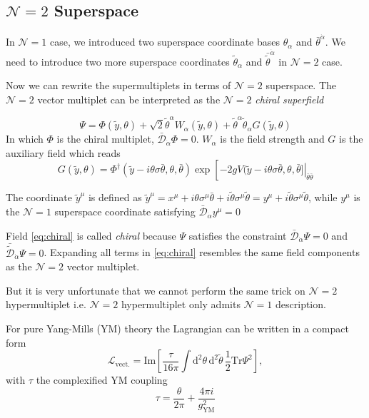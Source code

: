 \documentclass{article}
\begin{document}
\subsection{$\mathcal{N}=2$ Superspace}
In $\mathcal{N}=1$ case, we introduced two superspace coordinate bases $\theta_\alpha$ and $\bar{\theta}^{\dot{\alpha}}$. We need to introduce two more superspace coordinates $\tilde{\theta}_\alpha$ and $\bar{\tilde{\theta}}^{\dot{\alpha}}$ in $\mathcal{N}=2$ case.

Now we can rewrite the supermultiplets in terms of $\mathcal{N}=2$ superspace. The $\mathcal{N}=2$ vector multiplet can be interpreted as the $\mathcal{N}=2$ \textit{chiral superfield}

\begin{equation}
\label{eq:chiral}
\Psi=\Phi(\tilde{y}, \theta)+\sqrt{2} \tilde{\theta}^{\alpha} W_{\alpha}(\tilde{y}, \theta)+\tilde{\theta}^{\alpha} \tilde{\theta}_{\alpha}G(\tilde{y}, \theta)
\end{equation}
In which $\Phi$ is the chiral multiplet, $\bar{\mathcal{D}}_{\dot{\alpha}}\Phi=0$. $W_\alpha$ is the field strength and $G$ is the auxiliary field which reads
\begin{equation}
G(\tilde{y}, \theta)=\Phi^{\dagger}(\tilde{y}-i \theta \sigma \bar{\theta}, \theta, \bar{\theta}) \exp \left[\left.-2 g V(\tilde{y}-i \theta \sigma \bar{\theta}, \theta, \bar{\theta}]\right|_{\bar{\theta} \bar{\theta}}\right.
\end{equation}

The coordinate $\tilde{y}^\mu$ is defined as $\tilde{y}^\mu=x^{\mu}+i \theta \sigma^{\mu} \bar{\theta}+i \tilde{\theta} \sigma^{\mu} \tilde{\theta}=y^\mu+i \tilde{\theta} \sigma^{\mu} \tilde{\theta}$, while $y^\mu$ is the $\mathcal{N}=1$ superspace coordinate satisfying $\bar{\mathcal{D}}_{\dot{\alpha}}y^\mu=0$

Field \eqref{eq:chiral} is called \emph{chiral} because $\Psi$ satisfies the constraint $\bar{\mathcal{D}}_{\dot{\alpha}} \Psi=0$ and $\bar{\tilde{\mathcal{D}}}_{\dot{\alpha}} \Psi=0$. Expanding all terms in \eqref{eq:chiral} resembles the same field components as the $\mathcal{N}=2$ vector multiplet.

But it is very unfortunate that we cannot perform the same trick on $\mathcal{N}=2$ hypermultiplet i.e. $\mathcal{N}=2$ hypermultiplet only admits $\mathcal{N}=1$ description.

For pure Yang-Mills (YM) theory the Lagrangian can be written in a compact form
\begin{equation}
\label{eq:concisepureYM}
\mathcal{L}_{\mathrm{vect.}}=\mathrm{Im}\left[\frac{\tau}{16 \pi}  \int \mathrm{d}^{2} \theta\,\mathrm{d}^{2}\tilde{\theta}\,\frac{1}{2} \mathrm{Tr} \Psi^{2}\right],
\end{equation}
with $\tau$ the complexified YM coupling
\begin{equation}
\tau=\frac{\theta}{2\pi}+\frac{4\pi i}{g_{\mathrm{YM}}^2}
\end{equation}
\end{document}
